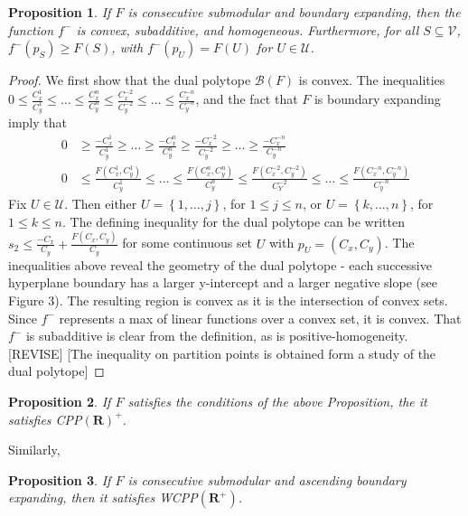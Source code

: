 \documentclass{article}
\newtheorem{prop}{Proposition}
\theoremstyle{case}
\begin{document}
\begin{prop}
If $F$ is consecutive submodular and boundary expanding, then the function $f^-$ is convex, subadditive, and homogeneous. Furthermore, for all $S \subseteq \mathcal{V}$, $f^-(p_S) \geq F(S)$, with $f^-(p_U) = F(U)$ for $U \in \mathcal{U}$.
\end{prop}
\begin{proof}
We first show that the dual polytope $\mathcal{B}(F)$ is convex. The inequalities $0 \leq \frac{C_x^1}{C_y^1} \leq \dots \leq \frac{C_x^n}{C_y^n} \leq \frac{C_x^{-2}}{C_y^{-2}} \leq \dots \leq \frac{C_x^{-n}}{C_y^{-n}}$, and the fact that $F$ is boundary expanding imply that
\begin{align*}
0 &\geq \frac{-C_x^1}{C_y^1} \geq \dots \geq \frac{-C_x^n}{C_y^n} \geq \frac{-C_x^{-2}}{C_y^{-2}} \geq \dots \geq \frac{-C_x^{-n}}{C_y^{-n}} \\
0 &\leq \frac{F(C_x^1, C_y^1)}{C_y^1} \leq \dots \leq \frac{F(C_x^n, C_y^n)}{C_y^n} \leq \frac{F(C_x^{-2}, C_y^{-2})}{C_Y^{-2}} \leq \dots \leq \frac{F(C_x^{-n}, C_y^{-n})}{C_y^{-n}}
\end{align*}
Fix $U \in \mathcal{U}$. Then either $U = \left\lbrace 1, \dots, j\right\rbrace$, for $1 \leq j \leq n$, or $U = \left\lbrace k, \dots, n\right\rbrace$, for $1 \leq k \leq n$. The defining inequality for the dual polytope can be written $s_2 \leq \frac{-C_x}{C_y} + \frac{F(C_x,C_y)}{C_y}$ for some continuous set $U$ with $p_U = (C_x, C_y)$. The inequalities above reveal the geometry of the dual polytope - each successive hyperplane boundary has a larger y-intercept and a larger negative slope (see Figure 3). The resulting region is convex as it is the intersection of convex sets. Since $f^-$ represents a max of linear functions over a convex set, it is convex. That $f^-$ is subadditive is clear from the definition, as is positive-homogeneity. 
[REVISE]
[The inequality on partition points is obtained form a study of the dual polytope]
\end{proof}
\begin{prop}
If $F$ satisfies the conditions of the above Proposition, the it satisfies CPP$(\mathbf{R})^+$.
\end{prop}
Similarly,
\begin{prop}
If $F$ is consecutive submodular and ascending boundary expanding, then it satisfies WCPP$(\mathbf{R}^+)$.
\end{prop}
\vspace{16pt}
\end{document}
